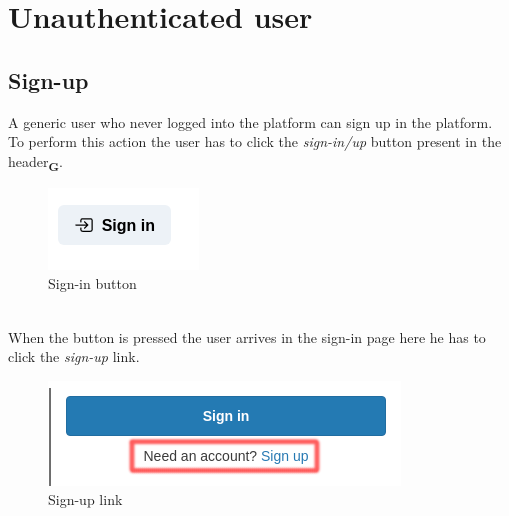 \section{Unauthenticated user}
\subsection{Sign-up}
A generic user who never logged into the platform can sign up in the platform. To perform this action the user has to click the \textit{sign-in/up} button present in the header\textsubscript{\textbf{G}}.
\begin{figure}[!ht]
    \caption{Sign-in button}
    \vspace{10px}
    \includegraphics[scale=0.5]{../../../../Images/userManual/signInButton.png}
    \centering
\end{figure}
\\
When the button is pressed the user arrives in the sign-in page here he has to click the \textit{sign-up} link.
\begin{figure}[!ht]
    \caption{Sign-up link}
    \vspace{10px}
    \includegraphics[scale=0.5]{../../../../Images/userManual/singUP.png}
    \centering
\end{figure}
